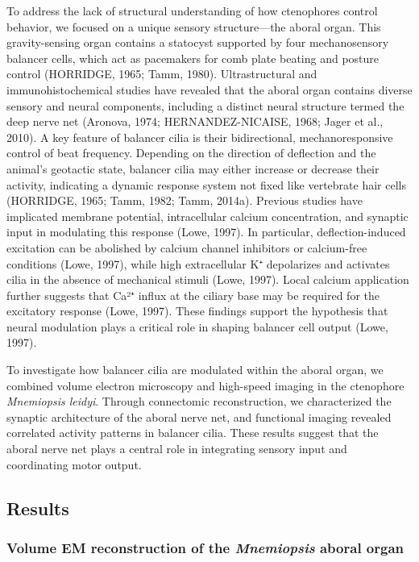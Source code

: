 \documentclass[
  11pt,
]{article}
\begin{document}
To address the lack of structural understanding of how ctenophores
control behavior, we focused on a unique sensory structure---the aboral
organ. This gravity-sensing organ contains a statocyst supported by four
mechanosensory balancer cells, which act as pacemakers for comb plate
beating and posture control (HORRIDGE, 1965; Tamm, 1980).
Ultrastructural and immunohistochemical studies have revealed that the
aboral organ contains diverse sensory and neural components, including a
distinct neural structure termed the deep nerve net (Aronova, 1974;
HERNANDEZ-NICAISE, 1968; Jager et al., 2010). A key feature of balancer
cilia is their bidirectional, mechanoresponsive control of beat
frequency. Depending on the direction of deflection and the animal's
geotactic state, balancer cilia may either increase or decrease their
activity, indicating a dynamic response system not fixed like vertebrate
hair cells (HORRIDGE, 1965; Tamm, 1982; Tamm, 2014a). Previous studies
have implicated membrane potential, intracellular calcium concentration,
and synaptic input in modulating this response (Lowe, 1997). In
particular, deflection-induced excitation can be abolished by calcium
channel inhibitors or calcium-free conditions (Lowe, 1997), while high
extracellular K⁺ depolarizes and activates cilia in the absence of
mechanical stimuli (Lowe, 1997). Local calcium application further
suggests that Ca²⁺ influx at the ciliary base may be required for the
excitatory response (Lowe, 1997). These findings support the hypothesis
that neural modulation plays a critical role in shaping balancer cell
output (Lowe, 1997).

To investigate how balancer cilia are modulated within the aboral organ,
we combined volume electron microscopy and high-speed imaging in the
ctenophore \emph{Mnemiopsis leidyi}. Through connectomic reconstruction,
we characterized the synaptic architecture of the aboral nerve net, and
functional imaging revealed correlated activity patterns in balancer
cilia. These results suggest that the aboral nerve net plays a central
role in integrating sensory input and coordinating motor output.

\subsection{Results}\label{results}

\subsubsection{\texorpdfstring{Volume EM reconstruction of the
\emph{Mnemiopsis} aboral
organ}{Volume EM reconstruction of the Mnemiopsis aboral organ}}\label{volume-em-reconstruction-of-the-mnemiopsis-aboral-organ}
\end{document}
